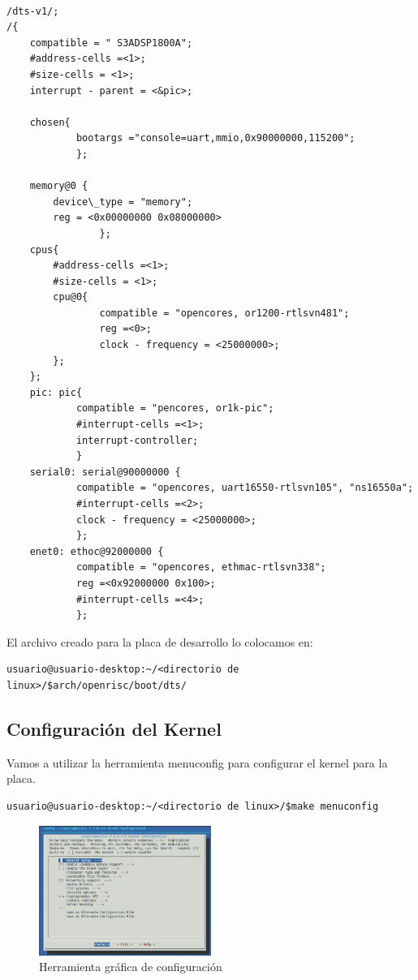 \begin{lstlisting}[frame=single,caption={Xilinxs3a.dts},label={lst:dts}]

/dts-v1/;
/{
	compatible = " S3ADSP1800A";
	#address-cells =<1>;
	#size-cells = <1>;
	interrupt - parent = <&pic>;
	
	chosen{
			bootargs ="console=uart,mmio,0x90000000,115200";
			};
	
	memory@0 {
		device\_type = "memory";
		reg = <0x00000000 0x08000000>
				};
	cpus{
		#address-cells =<1>;
		#size-cells = <1>;
		cpu@0{
				compatible = "opencores, or1200-rtlsvn481";
				reg =<0>;
				clock - frequency = <25000000>;
		};
	};
	pic: pic{
			compatible = "pencores, or1k-pic";
			#interrupt-cells =<1>;
			interrupt-controller;
			}
	serial0: serial@90000000 {
			compatible = "opencores, uart16550-rtlsvn105", "ns16550a";
			#interrupt-cells =<2>;
			clock - frequency = <25000000>;
			};
	enet0: ethoc@92000000 {
			compatible = "opencores, ethmac-rtlsvn338";
			reg =<0x92000000 0x100>;
			#interrupt-cells =<4>;
			};
	 \end{lstlisting}

El archivo creado para la placa de desarrollo lo colocamos en: 

\begin{lstlisting}[breaklines]
usuario@usuario-desktop:~/<directorio de linux>/$arch/openrisc/boot/dts/
\end{lstlisting}

\subsection{Configuración del Kernel}

Vamos a utilizar la herramienta menuconfig para configurar el kernel para la placa. 

\begin{lstlisting}[breaklines]
usuario@usuario-desktop:~/<directorio de linux>/$make menuconfig
\end{lstlisting}

\begin{figure}[h!]
 \begin{center}
  \includegraphics[width=0.5\textwidth,keepaspectratio=true]{./images/menuconf}
  \caption{Herramienta gráfica de configuración}
 \end{center}
\end{figure}

